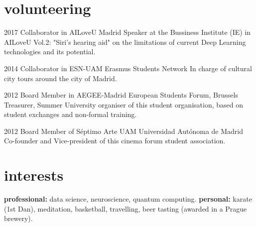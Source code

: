 \documentclass[]{friggeri-cv-a4}
\begin{document}


%





\section{volunteering}

\begin{entrylist}

\entry
{2017}
{Collaborator in AILoveU}
{Madrid}
{Speaker at the Bussiness Institute (IE) in AILoveU Vol.2: "Siri's hearing aid" on the limitations of current Deep Learning technologies and its potential.}



\entry
{2014}
{Collaborator in ESN-UAM}
{Erasmus Students Network}
{In charge of cultural city tours around the city of Madrid.}


\entry
{2012}
{Board Member in AEGEE-Madrid}
{European Students Forum, Brussels}
{Treasurer, Summer University organiser of this student organisation, based on student exchanges and non-formal training.}


\entry
{2012}
{Board Member of Séptimo Arte UAM}
{Universidad Autónoma de Madrid}
{Co-founder and Vice-president of this cinema forum student association.}


\end{entrylist}


\section{interests}

\textbf{professional:} data science, neuroscience, quantum computing. \textbf{personal:} karate (1st Dan), meditation, basketball, travelling, beer tasting (awarded in a Prague brewery).
\end{document}
